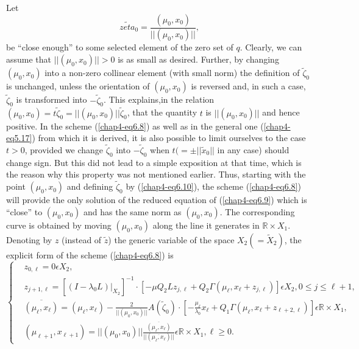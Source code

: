 Let 
\begin{equation*}
\widetilde{zeta}_{0} = \frac{(\mu_{0}, x_{0})}{||(\mu_{0},
  x_{0})||},\tag{6.10}\label{chap4-eq6.10} 
\end{equation*}
be ``close enough'' to some selected element of the zero set of
$q$. Clearly, we can assume that $||(\mu_{0}, x_{0})|| > 0$ is as small
as desired. Further, by changing $(\mu_{0}, x_{0})$ into a non-zero
collinear element (with small norm) the definition of
$\widetilde{\zeta}_{0}$ is unchanged, unless the orientation of
$(\mu_{0}, x_{0})$ is reversed and, in such a case,
$\widetilde{\zeta}_{0}$ is transformed into
$-\widetilde{\zeta}_{0}$. This explains,\pageoriginale in the relation
$(\mu_{0}, x_{0}) = t\widetilde{\zeta}_{0} = ||(\mu_{0}, x_{0})||
\widetilde{\zeta}_{0}$, that the quantity $t$ is $||(\mu_{0}, x_{0})||$
and hence positive. In the scheme (\ref{chap4-eq6.8}) as well as in
the general one (\ref{chap4-eq5.17}) from which it is derived, it is
also possible to limit ourselves to the case $t > 0$, provided we
change $\widetilde{\zeta}_{0}$ into $-\widetilde{\zeta}_{0}$ when $t(=
\pm ||\widetilde{x}_{0}||$ in any case) should change sign. But this
did not lead to a simple exposition at that time, which is the reason
why this property was not mentioned earlier. Thus, starting with the
point $(\mu_{0}, x_{0})$ and defining $\widetilde{\zeta}_{0}$ by
(\ref{chap4-eq6.10}), the scheme (\ref{chap4-eq6.8}) will provide the
only solution of the reduced equation of (\ref{chap4-eq6.9}) which is
``close'' to $(\mu_{0}, x_{0})$ and has the same norm as $(\mu_{0},
x_{0})$. The corresponding curve is obtained by moving $(\mu_{0},
x_{0})$ along the line it generates in $\mathbb{R} \times
X_{1}$. Denoting by $z$ (instead of $\widetilde{z}$) the generic
variable of the space $X_{2}(= \widetilde{X}_{2})$, the explicit form
of the scheme (\ref{chap4-eq6.8}) is 
{\fontsize{9}{11}\selectfont
\begin{equation*}
\begin{cases}
& z_{0, \ell} = 0 \epsilon X_{2},\\
& z_{j+1, \ell} = [(I - \lambda_{0}L)|_{X_{2}}]^{-1} \cdot [-\mu Q_{2}
  Lz_{j, \ell} + Q_{2}\Gamma(\mu_{\ell}, x_{\ell} + z_{j, \ell})]
  \epsilon X_{2}, 0 \leq j \leq \ell + 1,\\
& \overline{(\mu_{\ell}, x_{\ell})} = (\mu_{\ell}, x_{\ell}) -
  \frac{2}{||(\mu_{0}, x_{0})||} A(\widetilde{\zeta}_{0}) \cdot \left[
 -\frac{\mu_{\ell}}{\lambda_{0}} x_{\ell} + Q_{1} \Gamma(\mu_{\ell},
 x_{\ell} + z_{\ell + 2, \ell})\right] \epsilon \mathbb{R} \times
  X_{1},\\
& (\mu_{\ell+1}, x_{\ell+1}) = ||(\mu_{0}, x_{0})||
  \frac{\overline{(\mu_{\ell}, x_{\ell})}}{||(\overline{\mu_{\ell},
      x_{\ell}})||} \epsilon \mathbb{R} \times X_{1}, \ell \geq 0.
\end{cases}\tag{6.11}\label{chap4-eq6.11}
\end{equation*}}

